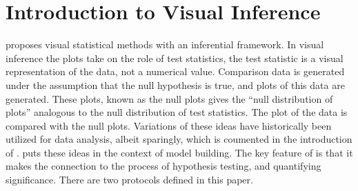 


\section{Introduction to Visual Inference} 

\citet{buja:2009} proposes visual statistical methods with an inferential framework. In visual inference the plots take on the role of test statistics, the test statistic is a visual representation of the data, not a numerical value. Comparison data is generated under the assumption that the null hypothesis is true, and plots of this data are generated. These plots, known as the null plots gives the ``null distribution of plots'' analogous to the null distribution of test statistics. The plot of the data is compared with the null plots. Variations of these ideas have historically been utilized for data analysis, albeit sparingly, which is coumented in the introduction of \cite{buja:2009}. \cite{gelman:2004} puts these ideas in the context of model building. The key feature of \cite{buja:2009} is that it makes the connection to the process of hypothesis testing, and quantifying significance. There are two protocols defined in this paper.

